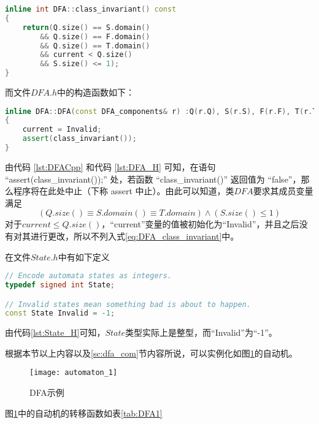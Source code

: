 \begin{lstlisting}[language=C++,label={lst:DFACpp},caption={DFA.cpp}]
inline int DFA::class_invariant() const
{
	return(Q.size() == S.domain()
		&& Q.size() == F.domain()
		&& Q.size() == T.domain()
		&& current < Q.size()
		&& S.size() <= 1);
}
\end{lstlisting}
而文件$DFA.h$中的构造函数如下：

\begin{lstlisting}[language=C++,label={lst:DFA_H},caption={DFA.h}]
inline DFA::DFA(const DFA_components& r) :Q(r.Q), S(r.S), F(r.F), T(r.T)
{
	current = Invalid;
	assert(class_invariant());
}
\end{lstlisting}
由代码 \ref{lst:DFACpp} 和代码 \ref{lst:DFA_H} 可知，在语句 “assert(class\_invariant());” 处，若函数 “class\_invariant()” 返回值为 “false”，那么程序将在此处中止\cite{assert_abort}（下称 assert 中止）。由此可以知道，类$DFA$要求其成员变量满足
\begin{equation}\label{eq:DFA_class_invariant}
    (Q.size() \equiv S.domain() \equiv T.domain ) \land (S.size() \leq 1)
\end{equation}
对于$current \le Q.size() $，“current”变量的值被初始化为“Invalid”，并且之后没有对其进行更改，所以不列入式\ref{eq:DFA_class_invariant}中。

在文件$State.h$中有如下定义

\begin{lstlisting}[language=C++,label={lst:State_H},caption={State.h}]
// Encode automata states as integers.
typedef signed int State;

// Invalid states mean something bad is about to happen.
const State Invalid = -1;
\end{lstlisting}
由代码\ref{lst:State_H}可知，$State$类型实际上是整型，而“Invalid”为“-1”。

根据本节以上内容以及\ref{sc:dfa_com}节内容所说，可以实例化如图\ref{fig:DFA1}的自动机。

\begin{figure}[!htbp]
    \centering
    \texttt{[image: automaton\_1]}
    \caption{DFA示例}
    \label{fig:DFA1}
\end{figure}

图\ref{fig:DFA1}中的自动机的转移函数如表\ref{tab:DFA1}

